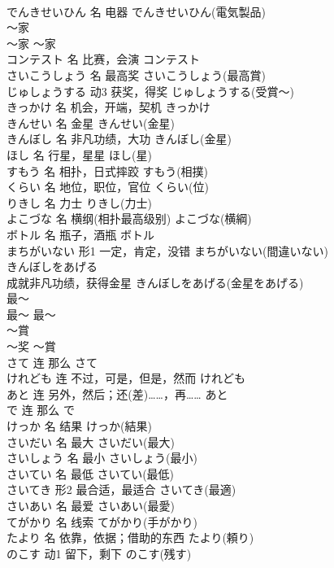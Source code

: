 \documentclass[8pt]{extreport}
\begin{document}
\begin{CJK}{UTF8}{min}
\\	でんきせいひん	名	电器	でんきせいひん(電気製品)	
\\	～家	
\\	～家	～家	
\\	コンテスト	名	比赛，会演	コンテスト	
\\	さいこうしょう	名	最高奖	さいこうしょう(最高賞)	
\\	じゅしょうする	动3	获奖，得奖	じゅしょうする(受賞～)	
\\	きっかけ	名	机会，开端，契机	きっかけ	
\\	きんせい	名	金星	きんせい(金星)	
\\	きんぼし	名	非凡功绩，大功	きんぼし(金星)	
\\	ほし	名	行星，星星	ほし(星)	
\\	すもう	名	相扑，日式摔跤	すもう(相撲)	
\\	くらい	名	地位，职位，官位	くらい(位)	
\\	りきし	名	力士	りきし(力士)	
\\	よこづな	名	横纲(相扑最高级别)	よこづな(横綱)	
\\	ボトル	名	瓶子，酒瓶	ボトル	
\\	まちがいない	形1	一定，肯定，没错	まちがいない(間違いない)	
\\	きんぼしをあげる	
\\	成就非凡功绩，获得金星	きんぼしをあげる(金星をあげる)	
\\	最～	
\\	最～	最～	
\\	～賞	
\\	～奖	～賞	
\\	さて	连	那么	さて	
\\	けれども	连	不过，可是，但是，然而	けれども	
\\	あと	连	另外，然后；还(差)……，再……	あと	
\\	で	连	那么	で	
\\	けっか	名	结果	けっか(結果)	
\\	さいだい	名	最大	さいだい(最大)	
\\	さいしょう	名	最小	さいしょう(最小)	
\\	さいてい	名	最低	さいてい(最低)	
\\	さいてき	形2	最合适，最适合	さいてき(最適)	
\\	さいあい	名	最爱	さいあい(最愛)	
\\	てがかり	名	线索	てがかり(手がかり)	
\\	たより	名	依靠，依据；借助的东西	たより(頼り)	
\\	のこす	动1	留下，剩下	のこす(残す)	

\end{CJK}
\end{document}

